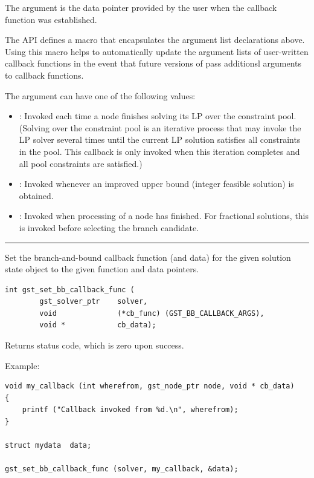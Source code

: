 The  argument is the data pointer provided by
the user when the callback function was established.

The \geosteiner{} API defines a macro
 that encapsulates the argument
list declarations above.
Using this macro helps to automatically update the argument lists
of user-written callback functions in the event that future
versions of \geosteiner{} pass additionsl arguments to callback
functions.

The  argument can have one of the following values:
\begin{itemize}
  \item {}:
	Invoked each time a node finishes solving its LP over the
	constraint pool.  (Solving over the constraint pool is an
	iterative process that may invoke the LP solver several
	times until the current LP solution satisfies all
	constraints in the pool.  This callback is only invoked
	when this iteration completes and all pool constraints
	are satisfied.)
  \item {}:
	Invoked whenever an improved upper bound (integer feasible
	solution) is obtained.
  \item {}:
	Invoked when processing of a node has finished.  For
	fractional solutions, this is invoked before selecting
	the branch candidate.
\end{itemize}

\clearpage{}
\label{gst_set_bb_callback_func}

\hrule
\vskip 0.25in
Set the branch-and-bound callback function (and data) for the given
solution state object to the given function and data pointers.

\begin{verbatim}
int gst_set_bb_callback_func (
        gst_solver_ptr    solver,
        void              (*cb_func) (GST_BB_CALLBACK_ARGS),
        void *            cb_data);

\end{verbatim}
Returns status code, which is zero upon success.

\bigskip{}Example:
{\footnotesize
\begin{verbatim}
void my_callback (int wherefrom, gst_node_ptr node, void * cb_data)
{
	printf ("Callback invoked from %d.\n", wherefrom);
}

struct mydata  data;

gst_set_bb_callback_func (solver, my_callback, &data);
\end{verbatim}
}
\clearpage{}
\label{gst_node_get_solver}

